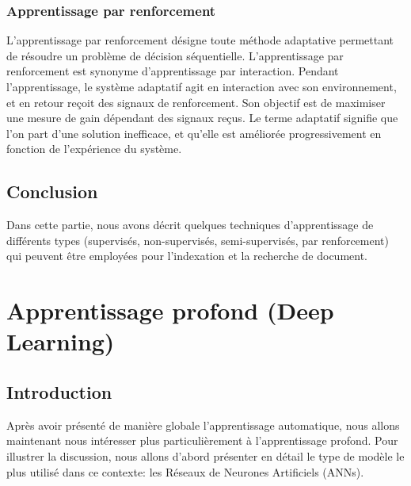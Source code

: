 \documentclass[12pt]{article}
\begin{document}
\subsubsection{Apprentissage par renforcement}
L’apprentissage par renforcement désigne toute méthode adaptative permettant de résoudre un problème de décision séquentielle. L'apprentissage par renforcement est synonyme d'apprentissage par interaction. Pendant l'apprentissage, le système adaptatif agit en interaction avec son environnement, et en retour reçoit des signaux de renforcement. Son objectif est de maximiser une mesure de gain dépendant des signaux reçus. Le terme adaptatif signifie que l'on part d'une solution inefficace, et qu'elle est améliorée progressivement en fonction de l'expérience du système.
\subsection{Conclusion}
Dans cette partie, nous avons décrit quelques techniques d'apprentissage de différents types (supervisés, non-supervisés, semi-supervisés, par renforcement) qui peuvent être employées pour l'indexation et la recherche de document.

\newpage
\section{Apprentissage profond (Deep Learning)}
\subsection{Introduction}
Après avoir présenté de manière globale l’apprentissage automatique, nous allons maintenant nous intéresser plus particulièrement à l’apprentissage profond. Pour illustrer la discussion, nous allons d’abord présenter en détail le type de modèle le plus utilisé dans ce contexte: les Réseaux de Neurones Artificiels (ANNs).
\end{document}
